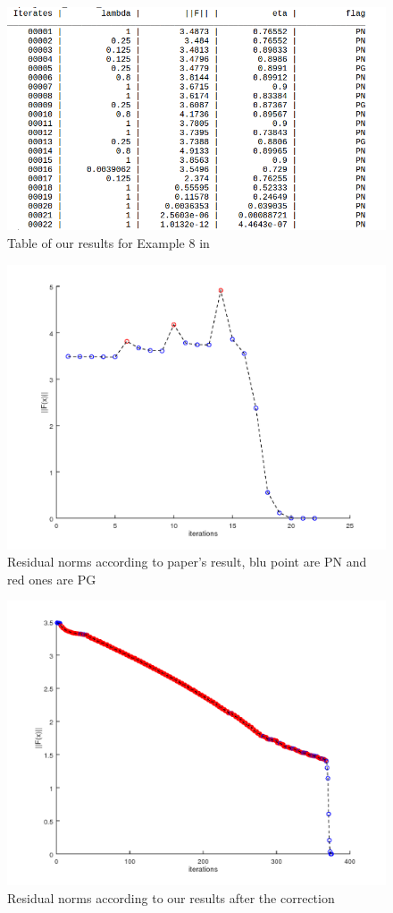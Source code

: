 \begin{figure}[h]
	\centering
	\includegraphics[width=1\linewidth]{ourresults8}
	\caption[Table of our results for example 8 in \cite{MAIN}]{Table of our results for Example 8 in \cite{MAIN}}
	\label{our_example8}
\end{figure}
\begin{figure}[h]
	\centering
	\includegraphics[width=0.8\linewidth]{res_paper}
	\caption[Plot of residuals without correction]{Residual norms according to paper's result, blu point are PN and red ones are PG}
	\label{res_paper}
\end{figure}
\begin{figure}[h]
	\centering
	\includegraphics[width=0.8\linewidth]{res_our}
	\caption[Plot of residuals with correction]{Residual norms according to our results after the correction}
	\label{res_our}
\end{figure}
